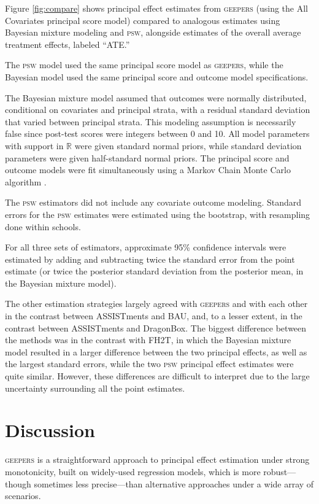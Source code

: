 \documentclass[]{article}
\begin{document}
Figure \ref{fig:compare} shows principal effect estimates from \textsc{geepers} (using the All Covariates principal score model) compared to analogous estimates using Bayesian mixture modeling and \textsc{psw}, alongside estimates of the overall average treatment effects, labeled ``ATE.''

The \textsc{psw} model used the same principal score model as \textsc{geepers}, while the Bayesian model used the same principal score and outcome model specifications.

The Bayesian mixture model assumed that outcomes were normally distributed, conditional on covariates and principal strata, with a residual standard deviation that varied between principal strata. This modeling assumption is necessarily false since post-test scores were integers between 0 and 10. All model parameters with support in $\mathbb{R}$ were given standard normal priors, while standard deviation parameters were given half-standard normal priors.
The principal score and outcome models were fit simultaneously using a Markov Chain Monte Carlo algorithm \citep{rstan}.

The \textsc{psw} estimators did not include any covariate outcome modeling. Standard errors for the \textsc{psw} estimates were estimated using the bootstrap, with resampling done within schools.

For all three sets of estimators, approximate 95\% confidence intervals were estimated by adding and subtracting twice the standard error from the point estimate (or twice the posterior standard deviation from the posterior mean, in the Bayesian mixture model).

The other estimation strategies largely agreed with \textsc{geepers} and with each other in the contrast between ASSISTments and BAU, and, to a lesser extent, in the contrast between ASSISTments and DragonBox. The biggest difference between the methods was in the contrast with FH2T, in which the Bayesian mixture model resulted in a larger difference between the two principal effects, as well as the largest standard errors, while the two \textsc{psw} principal effect estimates were quite similar.  However, these differences are difficult to interpret due to the large uncertainty surrounding all the point estimates.

\section{Discussion}\label{sec:discussion}
\textsc{geepers} is a straightforward approach to principal effect estimation under strong monotonicity, built on widely-used regression models, which is more robust---though sometimes less precise---than alternative approaches under a wide array of scenarios.
\end{document}
